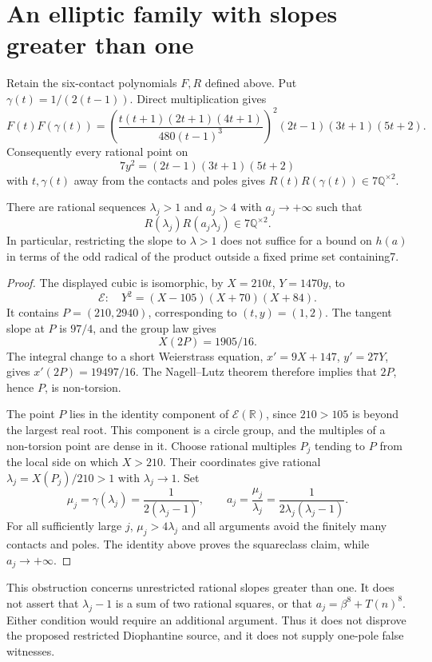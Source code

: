 \section{An elliptic family with slopes greater than one}

Retain the six-contact polynomials $F,R$ defined above.
Put $\gamma(t)=1/(2(t-1))$. Direct multiplication gives
\[
 F(t)F(\gamma(t))=
 \left(\frac{t(t+1)(2t+1)(4t+1)}{480(t-1)^3}\right)^2
                  (2t-1)(3t+1)(5t+2).
\]
Consequently every rational point on
\[
             7y^2=(2t-1)(3t+1)(5t+2)
\]
with $t,\gamma(t)$ away from the contacts and poles gives
$R(t)R(\gamma(t))\in7\mathbb Q^{\times2}$.

\begin{proposition}
There are rational sequences $\lambda_j>1$ and $a_j>4$ with
$a_j\to+\infty$ such that
\[
             R(\lambda_j)R(a_j\lambda_j)\in7\mathbb Q^{\times2}.
\]
In particular, restricting the slope to $\lambda>1$ does not
suffice for a bound on $h(a)$ in terms of the odd radical of the
product outside a fixed prime set containing7.
\end{proposition}
\begin{proof}
The displayed cubic is isomorphic, by $X=210t$, $Y=1470y$,
to
\[
 \mathcal E:\quad Y^2=(X-105)(X+70)(X+84).
\]
It contains $P=(210,2940)$, corresponding to $(t,y)=(1,2)$.
The tangent slope at $P$ is $97/4$, and the group law gives
\[
                         X(2P)=1905/16.
\]
The integral change to a short Weierstrass equation,
$x'=9X+147$, $y'=27Y$, gives
$x'(2P)=19497/16$. The Nagell--Lutz theorem therefore implies
that $2P$, hence $P$, is non-torsion.

The point $P$ lies in the identity component of
$\mathcal E(\mathbb R)$, since $210>105$ is beyond the largest
real root. This component is a circle group, and the multiples
of a non-torsion point are dense in it. Choose rational multiples
$P_j$ tending to $P$ from the local side on which $X>210$.
Their coordinates give rational $\lambda_j=X(P_j)/210>1$
with $\lambda_j\to1$. Set
\[
 \mu_j=\gamma(\lambda_j)=\frac1{2(\lambda_j-1)},\qquad
 a_j=\frac{\mu_j}{\lambda_j}
             =\frac1{2\lambda_j(\lambda_j-1)}.
\]
For all sufficiently large $j$, $\mu_j>4\lambda_j$ and
all arguments avoid the finitely many contacts and poles.
The identity above proves the squareclass claim, while
$a_j\to+\infty$.
\end{proof}

This obstruction concerns unrestricted rational slopes greater
than one. It does not assert that $\lambda_j-1$ is a sum of two
rational squares, or that $a_j=\beta^8+T(n)^8$. Either condition
would require an additional argument. Thus it does not disprove
the proposed restricted Diophantine source, and it does not supply
one-pole false witnesses.
